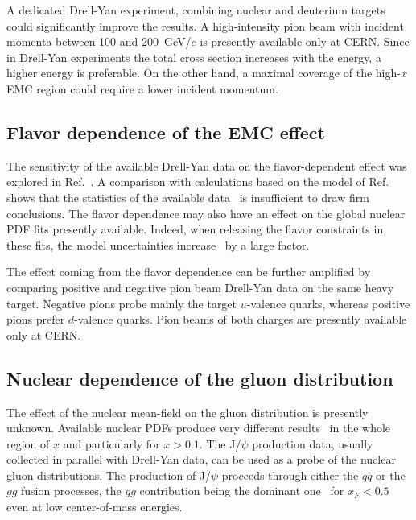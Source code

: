 A dedicated Drell-Yan experiment, 
combining nuclear and deuterium targets could significantly improve the results. 
A high-intensity pion beam with incident momenta between 100 and 200~GeV/$c$ is presently available 
only at CERN. Since in Drell-Yan experiments the total cross section increases with the energy, a higher 
energy is preferable. On the other hand, a maximal coverage of the high-$x$ EMC region could require a 
lower incident momentum.  

\subsection{Flavor dependence of the EMC effect} 

The sensitivity of the available Drell-Yan data on the flavor-dependent effect was explored in 
Ref.~\cite{Dutta:2010pg}. A comparison with calculations based on the model of Ref.~\cite{Cloet:2009qs} 
shows that the  statistics of the available data~\cite{Badier:1981ci,Bordalo:1987cs} is insufficient to draw firm conclusions. 
The flavor dependence may also have an effect 
on the global nuclear PDF fits presently available. Indeed, when releasing the flavor constraints in these fits, 
the model uncertainties increase~\cite{Paakkinen:2016wxk} by a large factor. 

The effect coming from the flavor dependence can be further amplified by 
comparing positive and negative pion beam Drell-Yan data on the same heavy target. Negative pions probe mainly the 
target $u$-valence quarks, whereas positive pions prefer $d$-valence quarks. Pion beams of both charges
are presently available only at CERN. 

\subsection{Nuclear dependence of the gluon distribution}
%
The effect of the nuclear mean-field on the gluon distribution is presently unknown. Available nuclear PDFs produce very different results~\cite{Cazaroto:2008qh} in the whole region of $x$ and particularly for $x > 0.1$. The J/$\psi$ production data,  usually collected in parallel with Drell-Yan data, can be used as a probe of the nuclear gluon distributions.  The production of J/$\psi$ proceeds through either the $q\bar q$ or the $gg$ fusion processes, the $gg$  contribution being the dominant one~\cite{Vogt:1999dw} for $x_F < 0.5$  even at low center-of-mass energies. 

